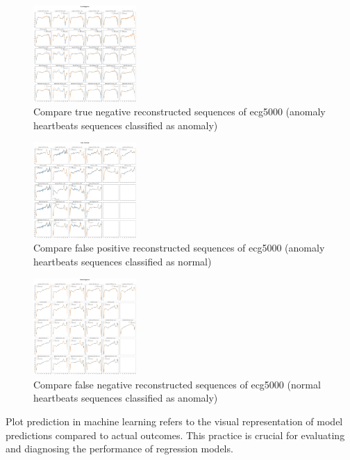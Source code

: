 \documentclass[nonacm,sigconf]{acmart}
\begin{document}
        \begin{figure}
        \centering
        \includegraphics[width=0.35\textwidth]{ecg5000/TN.png}
        \caption{Compare true negative reconstructed sequences of ecg5000 (anomaly heartbeats sequences classified as anomaly)}
        \label{fig:image1}
    \end{figure}%
        \begin{figure}
        \centering
        \includegraphics[width=0.35\textwidth]{ecg5000/FP.png}
        \caption{Compare false positive reconstructed sequences of ecg5000 (anomaly heartbeats sequences classified as normal)}
        \label{fig:image1}
    \end{figure}%
        \begin{figure}
        \centering
        \includegraphics[width=0.35\textwidth]{ecg5000/FN.png}
        \caption{Compare false negative reconstructed sequences of ecg5000 (normal heartbeats sequences classified as anomaly)}
        \label{fig:image1}
    \end{figure}%
Plot prediction in machine learning refers to the visual representation of model predictions compared to actual outcomes. This practice is crucial for evaluating and diagnosing the performance of regression models.
\end{document}
